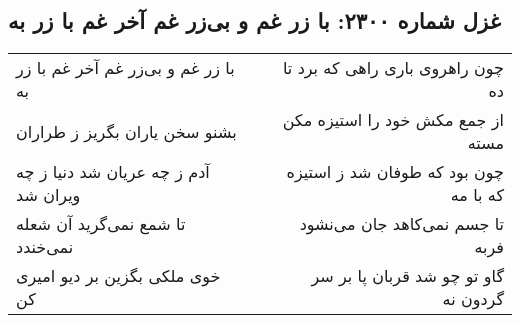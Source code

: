 \begin{center}
\section*{غزل شماره ۲۳۰۰: با زر غم و بی‌زر غم آخر غم با زر به}
\label{sec:2300}
\begin{longtable}{l p{0.5cm} r}
با زر غم و بی‌زر غم آخر غم با زر به
&&
چون راهروی باری راهی که برد تا ده
\\
بشنو سخن یاران بگریز ز طراران
&&
از جمع مکش خود را استیزه مکن مسته
\\
آدم ز چه عریان شد دنیا ز چه ویران شد
&&
چون بود که طوفان شد ز استیزه که با مه
\\
تا شمع نمی‌گرید آن شعله نمی‌خندد
&&
تا جسم نمی‌کاهد جان می‌نشود فربه
\\
خوی ملکی بگزین بر دیو امیری کن
&&
گاو تو چو شد قربان پا بر سر گردون نه
\\
\end{longtable}
\end{center}
